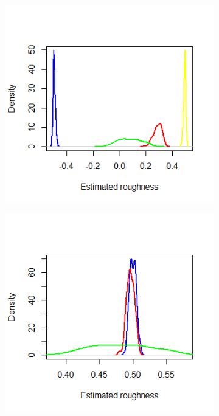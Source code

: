 \documentclass{article}
\begin{document}
\begin{figure}[htbp]
    \centering
    
    \begin{subfigure}{0.48\textwidth}
        \includegraphics[width=\linewidth]{ex5_densRV.png}
    \end{subfigure}
    \hfill
    \begin{subfigure}{0.48\textwidth}
        \includegraphics[width=\linewidth]{ex5_densIV.png}
    \end{subfigure}
    

\end{figure}
\end{document}
